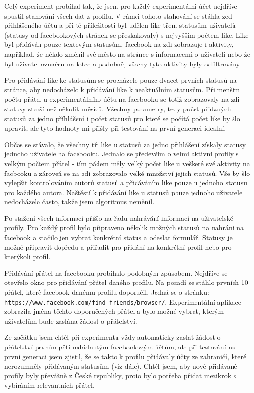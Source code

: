 \documentclass[thesis=M,czech]{FITthesis}[2013/05/10]
\begin{document}
Celý experiment probíhal tak, že jsem pro každý experimentální účet nejdříve spustil stahování všech dat z profilu. V rámci tohoto stahování se stáhla zeď přihlášeného účtu a při té příležitosti byl udělen like třem statusům uživatelů (statusy od facebookových stránek se přeskakovaly) s nejvyšším počtem like. Like byl přidáván pouze textovým statusům, facebook na zdi zobrazuje i aktivity, například, že někdo změnil své město na stránce s informacemi o uživateli nebo že byl uživatel označen na fotce a podobně, všechy tyto aktivity byly odfiltrovány. 

Pro přidávání like ke statusům se procházelo pouze dvacet prvních statusů na stránce, aby nedocházelo k přidávání like k neaktuálním statusům. Při menším počtu přátel u experimentálního účtu na facebooku se totiž zobrazovaly na zdi statusy starší než několik měsíců. Všechny parametry, tedy počet přidaných statusů za jedno příhlášení i počet statusů pro které se počítá počet like by šlo upravit, ale tyto hodnoty mi přišly při testování na první generaci ideální.

Občas se stávalo, že všechny tři like u statusů za jedno přihlášení získaly statusy jednoho uživatele na facebooku. Jednalo se především o velmi aktivní profily s velkým počtem přátel - tím pádem měly velký počet like u veškeré své aktivity na facbooku a zároveň se na zdi zobrazovalo velké množství jejich statusů. Vše by šlo vylepšit kontrolováním autorů statusů a přidáváním like pouze u jednoho statusu pro každého autora. Naštěstí k přidávání like u statusů pouze jednoho uživatele nedocházelo často, takže jsem algoritmus neměnil.

Po stažení všech informací přišlo na řadu nahrávání informací na uživatelské profily. Pro každý profil bylo připraveno několik možných statusů na nahrání na facebook a stačilo jen vybrat konkrétní status a odeslat formulář. Statusy je možné připravit dopředu a přiřadit pro přidání na konkrétní profil nebo pro kterýkoli profil.

Přidávání přátel na facebooku probíhalo podobným způsobem. Nejdříve se otevřelo okno pro přidávání přátel daného profilu. Na pozadí se stáhlo prvních 10 přátel, které facebook danému profilu doporučil. Jedná se o stránku: \verb|https://www.facebook.com/find-friends/browser/|. Experimentální aplikace zobrazila jména těchto doporučených přátel a bylo možné vybrat, kterým uživatelům bude zaslána žádost o přátelství. 

Ze začátku jsem chtěl při experimentu vždy automaticky zaslat žádost o přátelství prvním pěti nabídnutým facebookovým účtům, ale při testování na první generaci jsem zjistil, že se takto k profilu přidávaly účty ze zahraničí, které nerozumněly přidávaným statusům (viz dále). Chtěl jsem, aby nově přidávané profily byly převážně z České republiky, proto bylo potřeba přidat mezikrok s vybíráním relevantních přátel.
\end{document}
